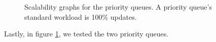 \begin{figure}[tbp]
  \centering
  \caption{Scalability graphs for the priority queues.  A priority queue's standard workload is 100\% updates.}
  \label{fig:priorityqueues}
\end{figure}

Lastly, in figure \ref{fig:priorityqueues}, we tested the two priority queues.

